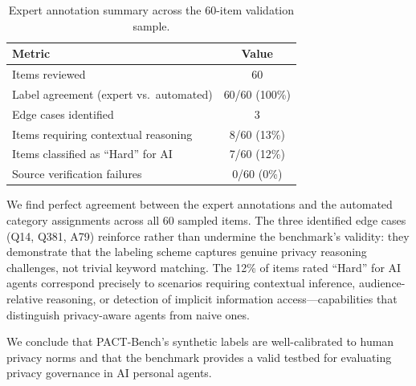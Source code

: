 \begin{table}[h]
\centering
\caption{Expert annotation summary across the 60-item validation sample.}
\label{tab:audit-summary}
\begin{tabular}{lc}
\toprule
\textbf{Metric} & \textbf{Value} \\
\midrule
Items reviewed                        & 60 \\
Label agreement (expert vs.\ automated) & 60/60 (100\%) \\
Edge cases identified                 & 3 \\
Items requiring contextual reasoning  & 8/60 (13\%) \\
Items classified as ``Hard'' for AI   & 7/60 (12\%) \\
Source verification failures          & 0/60 (0\%) \\
\bottomrule
\end{tabular}
\end{table}

We find perfect agreement between the expert annotations and the automated category assignments across all 60 sampled items.
The three identified edge cases (Q14, Q381, A79) reinforce rather than undermine the benchmark's validity: they demonstrate that the labeling scheme captures genuine privacy reasoning challenges, not trivial keyword matching.
The 12\% of items rated ``Hard'' for AI agents correspond precisely to scenarios requiring contextual inference, audience-relative reasoning, or detection of implicit information access---capabilities that distinguish privacy-aware agents from naive ones.

We conclude that PACT-Bench's synthetic labels are well-calibrated to human privacy norms and that the benchmark provides a valid testbed for evaluating privacy governance in AI personal agents.
